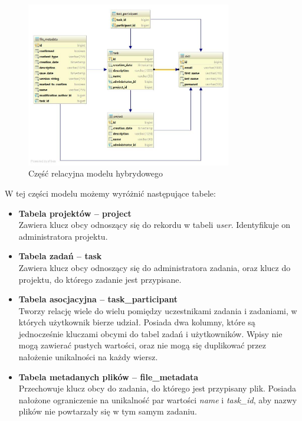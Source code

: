 \begin{figure}[!ht]
\centering
\includegraphics[width=0.8\textwidth]{figures/diagram.jpg}
\caption{Część relacyjna modelu hybrydowego}
\label{fig:postgreModelDiag}
\end{figure}

W tej części modelu możemy wyróżnić następujące tabele:
\begin{itemize}
    
    \item \textbf{Tabela projektów -- project} \\
    Zawiera klucz obcy odnoszący się do rekordu w tabeli \textit{user}. 
    Identyfikuje on administratora projektu.
    
    \item \textbf{Tabela zadań -- task} \\
    Zawiera klucz obcy odnoszący się do administratora zadania, oraz klucz do projektu, do którego zadanie jest przypisane.
    
    \item \textbf{Tabela asocjacyjna -- task\_participant} \\
    Tworzy relację wiele do wielu pomiędzy uczestnikami zadania i zadaniami, w których użytkownik bierze udział. 
    Posiada dwa kolumny, które są jednocześnie kluczami obcymi do tabel zadań i użytkowników. 
    Wpisy nie mogą zawierać pustych wartości, oraz nie mogą się duplikować przez nałożenie unikalności na każdy wiersz.
    
    \item \textbf{Tabela metadanych plików -- file\_metadata} \\
    Przechowuje klucz obcy do zadania, do którego jest przypisany plik.
    Posiada nałożone ograniczenie na unikalność par wartości \textit{name} i \textit{task\_id}, aby nazwy plików nie powtarzały się w tym samym zadaniu.
\end{itemize}

